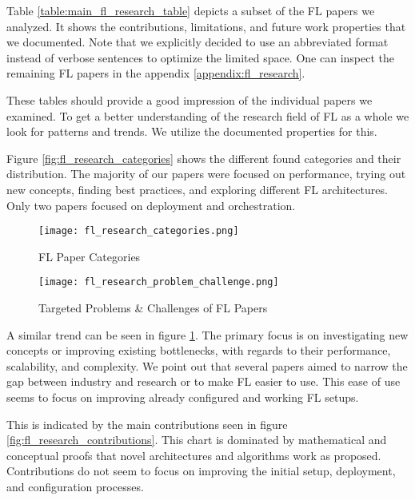 \begin{figure}[p]
    
\end{figure}

Table \ref{table:main_fl_research_table} depicts a subset of the FL papers we analyzed.
It shows the contributions, limitations, and future work properties that we documented.
Note that we explicitly decided to use an abbreviated format instead of verbose sentences
to optimize the limited space.
One can inspect the remaining FL papers in the appendix \ref{appendix:fl_research}.

These tables should provide a good impression of the individual papers we examined.
To get a better understanding of the research field of FL as a whole we look for patterns and trends.
We utilize the documented properties for this.

Figure \ref{fig:fl_research_categories} shows the different found categories and their distribution.
The majority of our papers were focused on performance, trying out new concepts, finding best practices,
and exploring different FL architectures.
Only two papers focused on deployment and orchestration.

\begin{figure}[p]
    \centering
    \texttt{[image: fl\_research\_categories.png]}
    \caption{FL Paper Categories}
    \label{fig:fl_research_categories}

    \texttt{[image: fl\_research\_problem\_challenge.png]}
    \caption{Targeted Problems \& Challenges of FL Papers}
    \label{fig:fl_research_problem_challenge}
\end{figure}

A similar trend can be seen in figure \ref{fig:fl_research_problem_challenge}.
The primary focus is on investigating new concepts or improving existing bottlenecks,
with regards to their performance, scalability, and complexity.
We point out that several papers aimed to narrow the gap between industry and research or
to make FL easier to use.
This ease of use seems to focus on improving already configured and working FL setups.

This is indicated by the main contributions seen in figure \ref{fig:fl_research_contributions}.
This chart is dominated by mathematical and conceptual proofs that novel
architectures and algorithms work as proposed.
Contributions do not seem to focus on improving the initial setup, deployment, and configuration processes.

